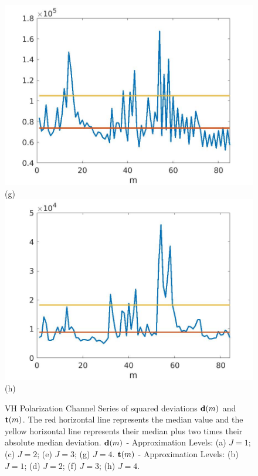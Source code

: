 \documentclass[journal]{IEEEtran}
\newcommand{\vd}{{\textbf d}}
\newcommand{\vt}{{\textbf t}}
\begin{document}
\begin{figure}[htp!]
\includegraphics[scale=.12]{../../figs/J4_VH_squared_meandev}(g)
\includegraphics[scale=.12]{../../figs/consecdif_J4_VH_squared_meandev}(h)
\caption{{\sc VH Polarization  Channel} Series of squared deviations $\vd(m)$ and $\vt(m)$. The red horizontal line represents the median value and the yellow horizontal line represents their median plus two times their absolute median deviation.  $\vd(m)$ - Approximation Levels:  (a) $J=1$; (c) $J=2$; (e) $J=3$; (g) $J=4$. $\vt(m)$ - Approximation Levels:  (b) $J=1$; (d) $J=2$; (f) $J=3$; (h) $J=4$. 
}
\label{F:squared_J1-4_VH}
\end{figure}
\end{document}
